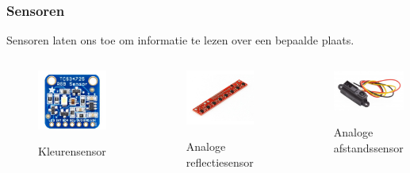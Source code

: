 \documentclass
   [kulak] %
   {kulakbeamer}
\begin{document}
\begin{frame}
	\frametitle{Sensoren}
	Sensoren laten ons toe om informatie te lezen over een bepaalde plaats.
	\begin{columns}
		\begin{figure}
			\centering
			\includegraphics[width=.7\textwidth]{kleurensensor}
			\caption{Kleurensensor}\cite{TCS34725KleurSensorBOB}
		\end{figure}
		\begin{figure}
			\centering
			\includegraphics[width=.8\textwidth]{reflectiesensor}
			\caption{Analoge reflectiesensor}\cite{QTR-8AAnalogeReflexieSensorArray}
		\end{figure}
		\begin{figure}
			\centering
			\includegraphics[width=.9\textwidth]{afstandssensor}
			\caption{Analoge afstandssensor}\cite{AnalogeAfstandssensor}
		\end{figure}
	\end{columns}
	

\end{frame}
\end{document}
